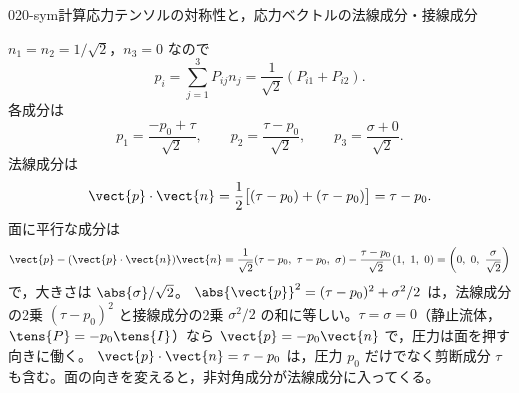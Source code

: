 \documentclass[uplatex,dvipdfmx,a4paper,11pt]{jsarticle}
\begin{document}
\begin{mondai}{020-sym}{計算}{応力テンソルの対称性と，応力ベクトルの法線成分・接線成分}
\begin{tadashii}
 $n_1=n_2=1/\sqrt{2}$，$n_3=0$ なので
\[ p_i=\sum_{j=1}^{3}P_{ij}n_j=\frac{1}{\sqrt{2}}\left(P_{i1}+P_{i2}\right). \]
各成分は
\[ p_1=\frac{-p_0+\tau}{\sqrt{2}},\qquad p_2=\frac{\tau-p_0}{\sqrt{2}},\qquad p_3=\frac{\sigma+0}{\sqrt{2}}. \]
 法線成分は
\[ \vect{p}\cdot\vect{n}=\frac{1}{2}\bigl[(\tau-p_0)+(\tau-p_0)\bigr]=\tau-p_0. \]
面に平行な成分は
\[ \vect{p}-(\vect{p}\cdot\vect{n})\vect{n}=\frac{1}{\sqrt{2}}(\tau-p_0,\ \tau-p_0,\ \sigma)-\frac{\tau-p_0}{\sqrt{2}}(1,\ 1,\ 0)=\left(0,\ 0,\ \frac{\sigma}{\sqrt{2}}\right) \]
で，大きさは $\abs{\sigma}/\sqrt{2}$。
\kenzan $\abs{\vect{p}}^{2}=(\tau-p_0)^{2}+\sigma^{2}/2$ は，法線成分の2乗 $(\tau-p_0)^{2}$ と接線成分の2乗 $\sigma^{2}/2$ の和に等しい。$\tau=\sigma=0$（静止流体，$\tens{P}=-p_0\tens{I}$）なら $\vect{p}=-p_0\vect{n}$ で，圧力は面を押す向きに働く。
\tsumazuki $\vect{p}\cdot\vect{n}=\tau-p_0$ は，圧力 $p_0$ だけでなく剪断成分 $\tau$ も含む。面の向きを変えると，非対角成分が法線成分に入ってくる。
\end{tadashii}
\end{mondai}
\end{document}
